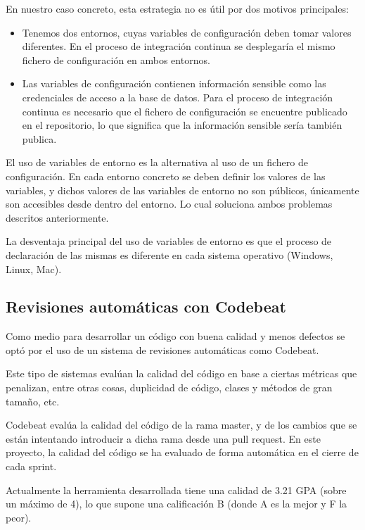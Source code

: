 En nuestro caso concreto, esta estrategia no es útil por dos motivos principales:

\begin{itemize}
	\item Tenemos dos entornos, cuyas variables de configuración deben tomar valores diferentes. En el proceso de integración continua se desplegaría el mismo fichero de configuración en ambos entornos.
	\item Las variables de configuración contienen información sensible como las credenciales de acceso a la base de datos. Para el proceso de integración continua es necesario que el fichero de configuración se encuentre publicado en el repositorio, lo que significa que la información sensible sería también publica.
\end{itemize}

El uso de variables de entorno es la alternativa al uso de un fichero de configuración. En cada entorno concreto se deben definir los valores de las variables, y dichos valores de las variables de entorno no son públicos, únicamente son accesibles desde dentro del entorno. Lo cual soluciona ambos problemas descritos anteriormente.

La desventaja principal del uso de variables de entorno es que el proceso de declaración de las mismas es diferente en cada sistema operativo (Windows, Linux, Mac).

\subsection{Revisiones automáticas con Codebeat}

Como medio para desarrollar un código con buena calidad y menos defectos se optó por el uso de un sistema de revisiones automáticas como Codebeat.

Este tipo de sistemas evalúan la calidad del código en base a ciertas métricas que penalizan, entre otras cosas, duplicidad de código, clases y métodos de gran tamaño, etc.

Codebeat evalúa la calidad del código de la rama master, y de los cambios que se están intentando introducir a dicha rama desde una pull request. En este proyecto, la calidad del código se ha evaluado de forma automática en el cierre de cada sprint.

Actualmente la herramienta desarrollada tiene una calidad de 3.21 GPA (sobre un máximo de 4), lo que supone una calificación B (donde A es la mejor y F la peor).


